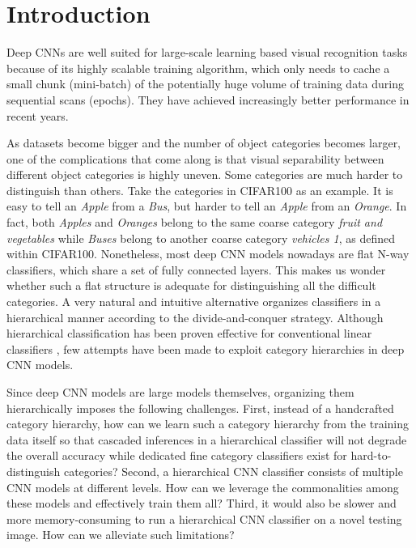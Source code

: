 \documentclass[10pt,twocolumn,letterpaper]{article}
\begin{document}
\section{Introduction}



Deep CNNs are well suited for large-scale learning based visual recognition tasks because of its highly scalable training algorithm, which only needs to cache a small chunk (mini-batch) of the potentially huge volume of training data during sequential scans (epochs). They have achieved increasingly better performance in recent years. 






As datasets become bigger and the number of object categories becomes larger, one of the complications that come along is that visual separability between different object categories is highly uneven. Some categories are much harder to distinguish than others. Take the categories in CIFAR100 as an example. It is easy to tell an \textit{Apple} from a \textit{Bus}, but harder to tell an \textit{Apple} from an \textit{Orange}. In fact, both \textit{Apples} and \textit{Oranges} belong to the same coarse category \textit{fruit and vegetables} while \textit{Buses} belong to another coarse category \textit{vehicles 1}, as defined within CIFAR100.
Nonetheless, most deep CNN models nowadays are flat N-way classifiers, which share a set of fully connected layers. This makes us wonder whether such a flat structure is adequate for distinguishing all the difficult categories. A very natural and intuitive alternative organizes classifiers in a hierarchical manner according to the divide-and-conquer strategy.  Although hierarchical classification has been proven effective for conventional linear classifiers \cite{zweig2007exploiting,fergus2010semantic,zhao2011large,liu2013probabilistic}, few attempts have been made to exploit category hierarchies \cite{deng2014large,srivastava2013discriminative} in deep CNN models.


Since deep CNN models are large models themselves, organizing them hierarchically imposes the following challenges. First, instead of a handcrafted category hierarchy, how can we learn such a category hierarchy from the training data itself so that cascaded inferences in a hierarchical classifier will not degrade the overall accuracy while dedicated fine category classifiers exist for hard-to-distinguish categories? Second, a hierarchical CNN classifier consists of multiple CNN models at different levels. How can we leverage the commonalities among these models and effectively train them all? Third, it would also be slower and more memory-consuming to run a hierarchical CNN classifier on a novel testing image. How can we alleviate such limitations?
\end{document}
